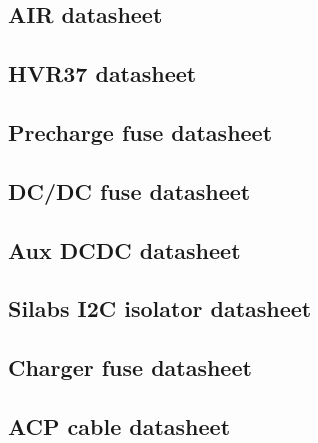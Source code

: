 \subsection{AIR datasheet}\label{app:air_datasheet}
	
	
\subsection{HVR37 datasheet}\label{app:hvr37_datasheet}
	
	
\subsection{Precharge fuse datasheet}\label{app:precharge_fuse_datasheet}
	

\subsection{DC/DC fuse datasheet}\label{app:dcdc_fuse_datasheet}
	

\subsection{Aux DCDC datasheet}\label{app:aux_dcdc_datasheet}
	

\subsection{Silabs I2C isolator datasheet}\label{app:ecua_isloator_datasheet}
	
	
\subsection{Charger fuse datasheet}\label{app:charger_fuse_datasheet}
	

\subsection{ACP cable datasheet}\label{app:PowerConductor}
	




\label{app:XT60connector}
